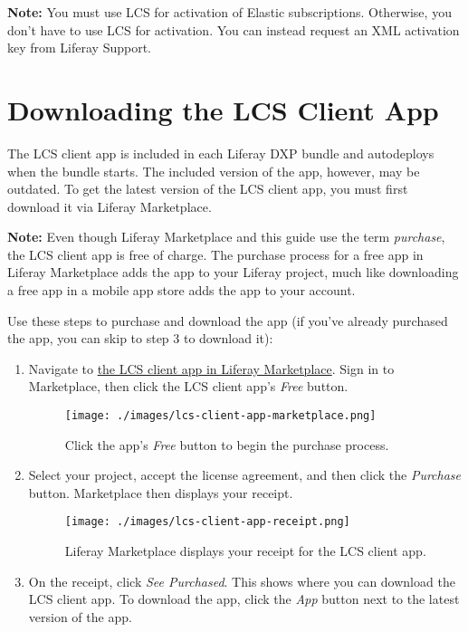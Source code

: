 \noindent\hrulefill

\textbf{Note:} You must use LCS for activation of Elastic subscriptions.
Otherwise, you don't have to use LCS for activation. You can instead
request an XML activation key from Liferay Support.

\noindent\hrulefill

\section{Downloading the LCS Client
App}\label{downloading-the-lcs-client-app}

The LCS client app is included in each Liferay DXP bundle and
autodeploys when the bundle starts. The included version of the app,
however, may be outdated. To get the latest version of the LCS client
app, you must first download it via Liferay Marketplace.

\noindent\hrulefill

\textbf{Note:} Even though Liferay Marketplace and this guide use the
term \emph{purchase}, the LCS client app is free of charge. The purchase
process for a free app in Liferay Marketplace adds the app to your
Liferay project, much like downloading a free app in a mobile app store
adds the app to your account.

\noindent\hrulefill

Use these steps to purchase and download the app (if you've already
purchased the app, you can skip to step 3 to download it):

\begin{enumerate}
\def\labelenumi{\arabic{enumi}.}
\item
  Navigate to
  \href{https://web.liferay.com/marketplace/-/mp/application/71774947}{the
  LCS client app in Liferay Marketplace}. Sign in to Marketplace, then
  click the LCS client app's \emph{Free} button.

  \begin{figure}
  \centering
  \texttt{[image: ./images/lcs-client-app-marketplace.png]}
  \caption{Click the app's \emph{Free} button to begin the purchase
  process.}
  \end{figure}
\item
  Select your project, accept the license agreement, and then click the
  \emph{Purchase} button. Marketplace then displays your receipt.

  \begin{figure}
  \centering
  \texttt{[image: ./images/lcs-client-app-receipt.png]}
  \caption{Liferay Marketplace displays your receipt for the LCS client
  app.}
  \end{figure}
\item
  On the receipt, click \emph{See Purchased}. This shows where you can
  download the LCS client app. To download the app, click the \emph{App}
  button next to the latest version of the app.
\end{enumerate}

